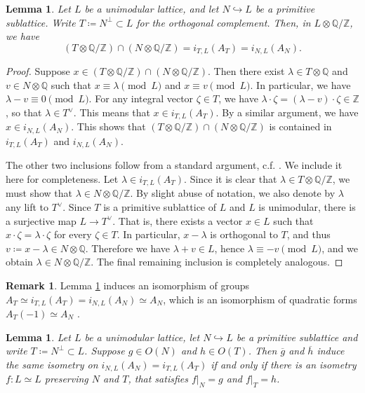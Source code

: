\documentclass[11pt,twoside]{amsart}
\numberwithin{equation}{section}
\newtheorem{lemma}[dummy]{Lemma}
\theoremstyle{definition}
\newtheorem{remark}[dummy]{Remark}
\theoremstyle{plain}
\newcommand{\Z}{\ensuremath{\mathbb{Z}}}
\newcommand{\Q}{\ensuremath{\mathbb{Q}}}
\begin{document}
\begin{lemma}\label{lem:intersectingspecialbrauer}
    Let $L$ be a unimodular lattice, and let $N\hookrightarrow L$ be a primitive sublattice. Write $T\coloneqq N^\perp\subset L$ for the orthogonal complement. Then, in $L\otimes \Q/\Z$, we have $$(T\otimes \Q/\Z)\cap (N\otimes \Q/\Z) = i_{T,L}(A_{T}) = i_{N,L}(A_{N}).$$
\end{lemma}
\begin{proof}
    Suppose $x\in (T\otimes \Q/\Z)\cap (N\otimes \Q/\Z)$. Then there exist $\lambda\in T\otimes \Q$ and $v\in N\otimes \Q$ such that $x\equiv \lambda \pmod{L}$ and $x\equiv v\pmod{L}.$ In particular, we have $\lambda-v\equiv 0\pmod{L}.$ For any integral vector $\zeta\in T$, we have $\lambda\cdot \zeta = (\lambda-v)\cdot \zeta \in \Z$, so that $\lambda\in T^\vee$. This means that $x\in i_{T,L}(A_{T})$. By a similar argument, we have $x\in i_{N,L}(A_{N})$. This shows that $(T\otimes \Q/\Z)\cap (N\otimes \Q/\Z)$ is contained in $i_{T,L}(A_{T})$ and $i_{N,L}(A_{N}).$ 
    
    The other two inclusions follow from a standard argument, c.f. \cite[Proposition 6.4]{Muk87}. We include it here for completeness. Let $\lambda\in i_{T,L}(A_{T})$. Since it is clear that $\lambda\in T\otimes \Q/\Z$, we must show that $\lambda\in N\otimes \Q/\Z$. By slight abuse of notation, we also denote by $\lambda$ any lift to $T^\vee$. Since $T$ is a primitive sublattice of $L$ and $L$ is unimodular, there is a surjective map $L\to T^\vee$. That is, there exists a vector $x\in L$ such that $x\cdot\zeta = \lambda\cdot\zeta$ for every $\zeta\in T$. In particular, $x-\lambda$ is orthogonal to $T$, and thus $v\coloneqq x-\lambda\in N\otimes \Q$. Therefore we have $\lambda+v\in L$, hence $\lambda\equiv -v\pmod {L}$, and we obtain $\lambda\in N\otimes \Q/\Z$. The final remaining inclusion is completely analogous.
\end{proof}

\begin{remark}\label{rmk:discriminantorthogonal}
    Lemma \ref{lem:intersectingspecialbrauer} induces an isomorphism of groups $A_T\simeq i_{T,L}(A_T) = i_{N,L}(A_N)\simeq A_N$, which is an isomorphism of quadratic forms $A_{T}(-1)\simeq A_N$ \cite[Proposition 1.6.1]{Nik80}.
\end{remark}


\begin{lemma}\label{lem:nikulinorthogonal} \cite[Proposition 1.6.1]{Nik80}
    Let $L$ be a unimodular lattice, let $N\hookrightarrow L$ be a primitive sublattice and write $T\coloneqq N^\perp \subset L$. Suppose $g\in O(N)$ and $h\in O(T)$. Then $\overline{g}$ and $\overline{h}$ induce the same isometry on $i_{N,L}(A_N) = i_{T,L}(A_T)$ if and only if there is an isometry $f: L\simeq L$ preserving $N$ and $T$, that satisfies $f|_N = g$ and $f|_T = h$.
\end{lemma}
\end{document}
